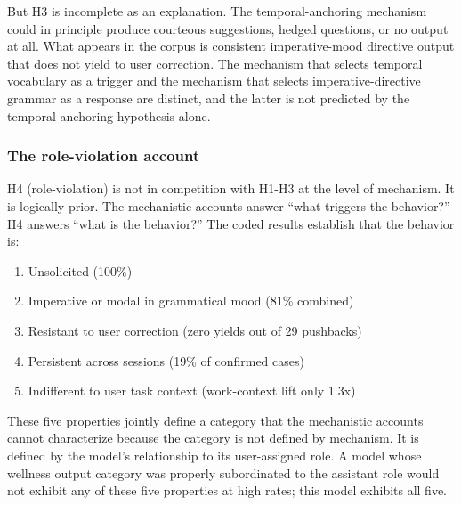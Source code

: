 \documentclass[11pt]{article}
\begin{document}
But H3 is incomplete as an explanation. The temporal-anchoring mechanism could in principle produce courteous suggestions, hedged questions, or no output at all. What appears in the corpus is consistent imperative-mood directive output that does not yield to user correction. The mechanism that selects temporal vocabulary as a trigger and the mechanism that selects imperative-directive grammar as a response are distinct, and the latter is not predicted by the temporal-anchoring hypothesis alone.

\subsubsection{The role-violation account}

H4 (role-violation) is not in competition with H1-H3 at the level of mechanism. It is logically prior. The mechanistic accounts answer ``what triggers the behavior?'' H4 answers ``what is the behavior?'' The coded results establish that the behavior is:

\begin{enumerate}[leftmargin=*]
  \item Unsolicited (100\%)
  \item Imperative or modal in grammatical mood (81\% combined)
  \item Resistant to user correction (zero yields out of 29 pushbacks)
  \item Persistent across sessions (19\% of confirmed cases)
  \item Indifferent to user task context (work-context lift only 1.3x)
\end{enumerate}

These five properties jointly define a category that the mechanistic accounts cannot characterize because the category is not defined by mechanism. It is defined by the model's relationship to its user-assigned role. A model whose wellness output category was properly subordinated to the assistant role would not exhibit any of these five properties at high rates; this model exhibits all five.
\end{document}
